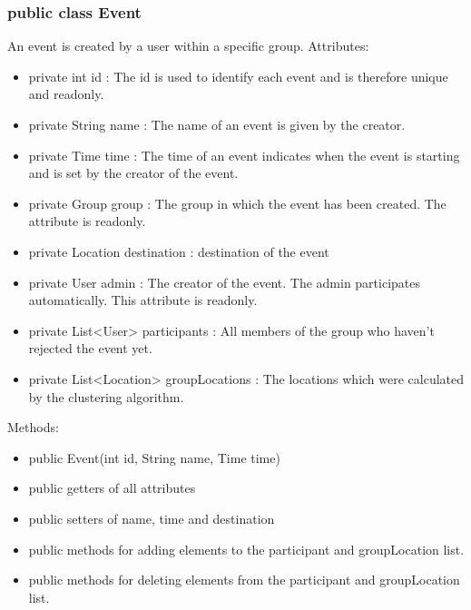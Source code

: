 	\subsubsection{public class Event}
	An event is created by a user within a specific group.
	\newline Attributes:
	\begin{itemize}
	\item private  int id : The id is used to identify each event and is therefore unique and readonly.
	\item private String name : The name of an event is given by the creator.
	\item private Time time : The time of an event indicates when the event is starting and is set by the creator of the event.
	\item private Group group : The group in which the event has been created. The attribute is readonly.
	\item private Location destination : destination of the event
	\item private User admin : The creator of the event. The admin participates automatically. This attribute is readonly.
	\item private List<User> participants : All members of the group who haven't rejected the event yet.
	\item private List<Location> groupLocations : The locations which were calculated by the clustering algorithm.
	\end{itemize}
	Methods:
	\begin{itemize}
	\item public Event(int id, String name, Time time)
	\item public getters of all attributes
	\item public setters of name, time and destination
	\item public methods for adding elements to the participant and groupLocation list.
	\item public methods for deleting elements from the participant and groupLocation list.
	\end{itemize}
	\newpage
